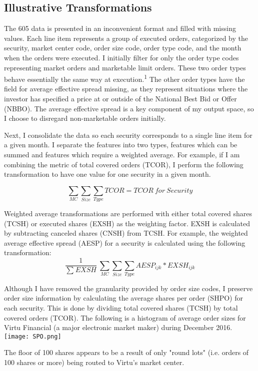 \documentclass{article}
\begin{document}
\begin{multicols}{2}
\subsection{Illustrative Transformations}
\par
The 605 data is presented in an inconvenient format and filled with missing values. Each line item represents a group of executed orders, categorized by the security, market center code, order size code, order type code, and the month when the orders were executed. I initially filter for only the order type codes representing market orders and marketable limit orders. These two order types behave essentially the same way at execution.\textsuperscript{1} The other order types have the field for average effective spread missing, as they represent situations where the investor has specified a price at or outside of the National Best Bid or Offer (NBBO). The average effective spread is a key component of my output space, so I choose to disregard non-marketable orders initially.
\par
Next, I consolidate the data so each security corresponds to a single line item for a given month. I separate the features into two types, features which can be summed and features which require a weighted average. For example, if I am combining the metric of total covered orders (TCOR), I perform the following transformation to have one value for one security in a given month.

\begin{equation}\sum_{MC} \sum_{Size} \sum_{Type} TCOR = TCOR \: for \: Security \end{equation}

\par
Weighted average transformations are performed with either total covered shares (TCSH) or executed shares (EXSH) as the weighting factor. EXSH is calculated by subtracting canceled shares (CNSH) from TCSH. For example, the weighted average effective spread (AESP) for a security is calculated using the following transformation:
\begin{equation} \frac{1}{\sum_{}EXSH}\ \sum_{MC} \sum_{Size} \sum_{Type} AESP_{ijk}*EXSH_{ijk} \end{equation}

\par
Although I have removed the granularity provided by order size codes, I preserve order size information by calculating the average shares per order (SHPO) for each security. This is done by dividing total covered shares (TCSH) by total covered orders (TCOR). The following is a histogram of average order sizes for Virtu Financial (a major electronic market maker) during December 2016.
\begingroup
    \centering
    \texttt{[image: SPO.png]}
\endgroup
\vspace{3mm}
\par
\noindent The floor of 100 shares appears to be a result of only "round lots" (i.e. orders of 100 shares or more) being routed to Virtu's market center.



\end{multicols}
\end{document}
